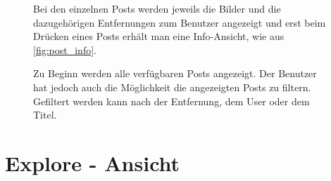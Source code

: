 \begin{figure}[H]
\begin{minipage}{.6\textwidth}
\begin{changemargin}{0.5cm}{0cm}
            Bei den einzelnen Posts werden jeweils die Bilder und die dazugehörigen Entfernungen zum Benutzer angezeigt und erst beim Drücken eines Posts erhält man eine Info-Ansicht, wie aus \autoref{fig:post_info}.

            Zu Beginn werden alle verfügbaren Posts angezeigt. Der Benutzer hat jedoch auch die Möglichkeit die angezeigten Posts zu filtern. Gefiltert werden kann nach der Entfernung, dem User oder dem Titel.
        \end{changemargin}
    \end{minipage}
\end{figure}

\section{Explore - Ansicht\label{sec4.4:Unterpunkt-4}}

